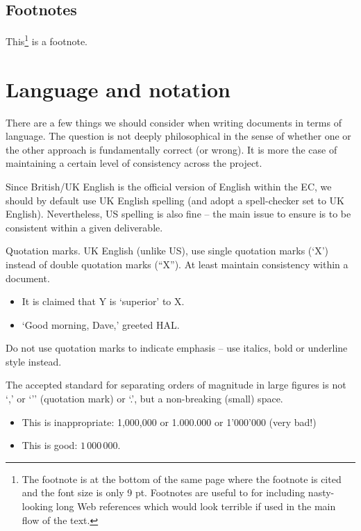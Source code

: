 \documentclass[10pt]{report}
\begin{document}
\subsection{Footnotes}

This\footnote{The footnote is at the bottom of the same page where the footnote is cited and the font size is only 9 pt. Footnotes are useful to for including nasty-looking long Web references which would look terrible if used in the main flow of the text.} is a footnote.

\section{Language and notation}

There are a few things we should consider when writing documents in terms of language. The question is not deeply philosophical in the sense of whether one or the other approach is fundamentally correct (or wrong). It is more the case of maintaining a certain level of consistency across the project.

Since British/UK English is the official version of English within the EC, we should by default use UK English spelling (and adopt a spell-checker set to UK English). Nevertheless, US spelling is also fine – the main issue to ensure is to be consistent within a given deliverable.

Quotation marks. UK English (unlike US), use single quotation marks (‘X’) instead of double quotation marks (“X”). At least maintain consistency within a document. 

\begin{itemize}
\item  It is claimed that Y is ‘superior’ to X. 
\item  ‘Good morning, Dave,’ greeted HAL.
\end{itemize}

Do not use quotation marks to indicate emphasis – use italics, bold or underline style instead.

The accepted standard for separating orders of magnitude in large figures is not ‘,’ or ‘’’ (quotation mark) or ‘.’, but a non-breaking (small) space. 

\begin{itemize}
\item   This is inappropriate: 1,000,000 or 1.000.000 or 1’000’000
  (very bad!) 
\item  This is good: $1\,000\,000$. 
\end{itemize}
\end{document}
